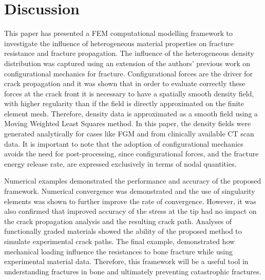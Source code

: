 \documentclass[onecolumn]{svjour3}
\begin{document}
\section{Discussion}\label{sec:discussion}
This paper has presented a FEM computational modelling framework to investigate the influence of heterogeneous material properties on fracture resistance and fracture propagation. 
The influence of the heterogeneous density distribution was captured using an extension of the authors' previous work on configurational mechanics for fracture. 
Configurational forces are the driver for crack propagation and it was shown that in order to evaluate correctly these forces at the crack front it is necessary to have a spatially smooth density field, with higher regularity than if the field is directly approximated on the finite element mesh. 
Therefore, density data is approximated as a smooth field using a Moving Weighted Least Squares method. 
In this paper, the density fields were generated analytically for cases like FGM and from clinically available CT scan data. 
It is important to note that the adoption of configurational mechanics avoids the need for post-processing, since configurational forces, and the fracture energy release rate, are expressed exclusively in terms of nodal quantities.


Numerical examples demonstrated the performance and accuracy of the proposed framework. 
Numerical convergence was demonstrated and the use of singularity elements was shown to further improve the rate of convergence. 
However, it was also confirmed that improved accuracy of the stress at the tip had no impact on the crack propagation analysis and the resulting crack path. Analyses of functionally graded materials showed the ability of the proposed method to simulate experimental crack paths. The final example, demonstrated how mechanical loading influence the resistances to bone fracture while using experimental material data. Therefore, this framework will be a useful tool in understanding fractures in bone and ultimately preventing catastrophic fractures. 
\end{document}
